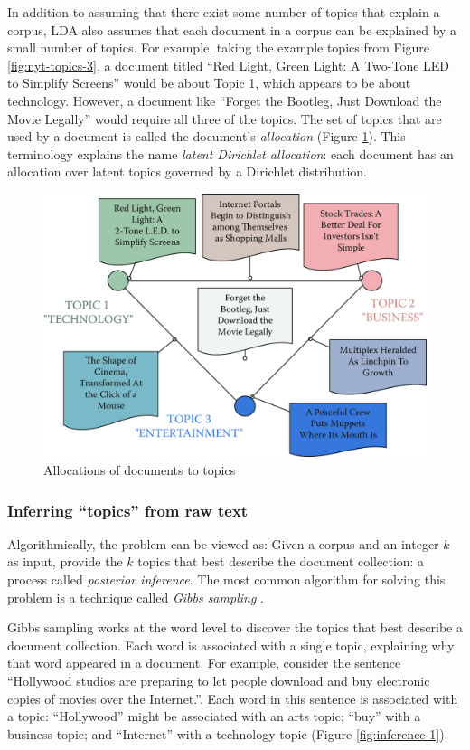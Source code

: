 \documentclass[]{krantz}
\begin{document}
In addition to assuming that there exist some number of topics that
explain a corpus, LDA also assumes that each document in a corpus can be
explained by a small number of topics. For example, taking the example
topics from Figure \ref{fig:nyt-topics-3}, a document titled ``Red
Light, Green Light: A Two-Tone LED to Simplify Screens'' would be about
Topic 1, which appears to be about technology. However, a document like
``Forget the Bootleg, Just Download the Movie Legally'' would require
all three of the topics. The set of topics that are used by a document
is called the document's \emph{allocation} (Figure
\ref{fig:nyt-documents}). This terminology explains the name
\emph{latent Dirichlet allocation}: each document has an allocation over
latent topics governed by a Dirichlet distribution.

\begin{figure}

{\centering \includegraphics[width=0.7\linewidth]{ChapterText/figures/nyt_documents} 

}

\caption{Allocations of documents to topics}\label{fig:nyt-documents}
\end{figure}

\subsubsection{\texorpdfstring{Inferring ``topics'' from raw
text}{Inferring topics from raw text}}\label{inferring-topics-from-raw-text}

Algorithmically, the problem can be viewed as: Given a corpus and an
integer \(k\) as input, provide the \(k\) topics that best describe the
document collection: a process called \emph{posterior inference}. The
most common algorithm for solving this problem is a technique called
\emph{Gibbs sampling} \citep{geman-90}.

Gibbs sampling works at the word level to discover the topics that best
describe a document collection. Each word is associated with a single
topic, explaining why that word appeared in a document. For example,
consider the sentence ``Hollywood studios are preparing to let people
download and buy electronic copies of movies over the Internet.''. Each
word in this sentence is associated with a topic: ``Hollywood'' might be
associated with an arts topic; ``buy'' with a business topic; and
``Internet'' with a technology topic (Figure \ref{fig:inference-1}).
\end{document}
